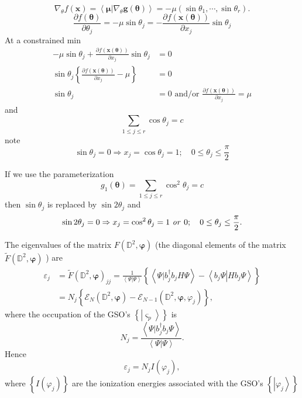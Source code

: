 \documentclass[aps,preprint]{revtex4}%
\begin{document}
\[
\nabla_{\theta}f\left(  \boldsymbol{x}\right)  =\left\langle \boldsymbol{\mu
}\left\vert \nabla_{\theta}\boldsymbol{g}\left(  \boldsymbol{\theta}\right)
\right.  \right\rangle =-\mu\left(  \sin\theta_{1},\cdots,\sin\theta
_{r}\right)  .
\]%
\[
\frac{\partial f\left(  \boldsymbol{\theta}\right)  }{\partial\theta_{j}}%
=-\mu\sin\theta_{j}=-\frac{\partial f\left(  \boldsymbol{x}\left(
\boldsymbol{\theta}\right)  \right)  }{\partial x_{j}}\sin\theta_{j}%
\]
At a constrained min
\begin{align*}
-\mu\sin\theta_{j}+\frac{\partial f\left(  \boldsymbol{x}\left(
\boldsymbol{\theta}\right)  \right)  }{\partial x_{j}}\sin\theta_{j}  &  =0\\
\sin\theta_{j}\left\{  \frac{\partial f\left(  \boldsymbol{x}\left(
\boldsymbol{\theta}\right)  \right)  }{\partial x_{j}}-\mu\right\}   &  =0\\
\sin\theta_{j}  &  =0\text{ and/or }\frac{\partial f\left(  \boldsymbol{x}%
\left(  \boldsymbol{\theta}\right)  \right)  }{\partial x_{j}}=\mu
\end{align*}
and
\[
\sum_{1\leq j\leq r}\cos\theta_{j}=c
\]
note
\[
\sin\theta_{j}=0\Rightarrow x_{j}=\cos\theta_{j}=1;\quad0\leq\theta_{j}%
\leq\frac{\pi}{2}%
\]


If we use the parameterization
\[
g_{1}\left(  \boldsymbol{\theta}\right)  =\sum_{1\leq j\leq r}\cos^{2}%
\theta_{j}=c
\]
then $\sin\theta_{j}$ is replaced by $\sin2\theta_{j}$ and
\[
\sin2\theta_{j}=0\Rightarrow x_{j}=\cos^{2}\theta_{j}=1\text{ \emph{or }%
}0;\quad0\leq\theta_{j}\leq\frac{\pi}{2}.
\]


The eigenvalues of the matrix $F\left(  \mathbb{D}^{2},\boldsymbol{\varphi
}\right)  $ (the diagonal elements of the matrix $\tilde{F}\left(
\mathbb{D}^{2},\boldsymbol{\varphi}\right)  $ ) are
\begin{align}
\varepsilon_{j}  &  =\tilde{F}\left(  \mathbb{D}^{2},\boldsymbol{\varphi
}\right)  _{jj}=\frac{1}{\left\langle \left.  \Psi\right\vert \Psi
\right\rangle }\left\{  \left\langle \left.  \Psi\right\vert b_{j}^{\dagger
}b_{j}H\Psi\right\rangle -\left\langle \left.  b_{j}\Psi\right\vert Hb_{j}%
\Psi\right\rangle \right\} \nonumber\\
&  =N_{j}\left\{  \mathcal{E}_{N}\left(  \mathbb{D}^{2},\boldsymbol{\varphi
}\right)  -\mathcal{E}_{N-1}\left(  \mathbb{D}^{2},\boldsymbol{\varphi
,}\varphi_{j}\right)  \right\}  ,
\end{align}
where the occupation of the GSO's $\left\{  \left\vert \varsigma
_{p}\right\rangle \right\}  $ is
\begin{equation}
N_{j}=\frac{\left\langle \left.  \Psi\right\vert b_{j}^{\dagger}b_{j}%
\Psi\right\rangle }{\left\langle \left.  \Psi\right\vert \Psi\right\rangle }.
\end{equation}
Hence
\begin{equation}
\varepsilon_{j}=N_{j}I\left(  \varphi_{j}\right)  ,
\end{equation}
where $\left\{  I\left(  \varphi_{j}\right)  \right\}  $ are the ionization
energies associated with the GSO's $\left\{  \left\vert \varphi_{j}%
\right\rangle \right\}  $
\end{document}
